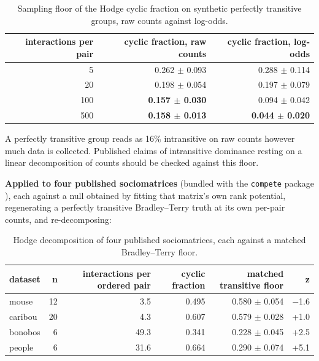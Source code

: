\documentclass[aps,pre,preprint,superscriptaddress,nofootinbib,longbibliography]{revtex4-2}
\begin{document}
\begin{table}[htbp]
\caption{Sampling floor of the Hodge cyclic fraction on synthetic perfectly transitive groups, raw counts against log-odds.}
\label{tab:21}
\begin{ruledtabular}
\begin{tabular}{rrr}
interactions per pair & cyclic fraction, raw counts & cyclic fraction, log-odds \\
\hline
5 & 0.262 $\pm$ 0.093 & 0.288 $\pm$ 0.114 \\
20 & 0.198 $\pm$ 0.054 & 0.197 $\pm$ 0.079 \\
100 & \textbf{0.157 $\pm$ 0.030} & 0.094 $\pm$ 0.042 \\
500 & \textbf{0.158 $\pm$ 0.013} & \textbf{0.044 $\pm$ 0.020} \\
\end{tabular}
\end{ruledtabular}
\end{table}

A perfectly transitive group reads as 16\% intransitive on raw counts however much data is collected. Published claims of intransitive dominance resting on a linear decomposition of counts should be checked against this floor.

\textbf{Applied to four published sociomatrices} (bundled with the \texttt{compete} package \cite{r29}), each against a null obtained by fitting that matrix's own rank potential, regenerating a perfectly transitive Bradley--Terry truth at its own per-pair counts, and re-decomposing:

\begin{table}[htbp]
\caption{Hodge decomposition of four published sociomatrices, each against a matched Bradley--Terry floor.}
\label{tab:22}
\begin{ruledtabular}
\begin{tabular}{lrrrrr}
dataset & n & interactions per ordered pair & cyclic fraction & matched transitive floor & z \\
\hline
mouse & 12 & 3.5 & 0.495 & 0.580 $\pm$ 0.054 & $-$1.6 \\
caribou & 20 & 4.3 & 0.607 & 0.579 $\pm$ 0.028 & +1.0 \\
bonobos & 6 & 49.3 & 0.341 & 0.228 $\pm$ 0.045 & +2.5 \\
people & 6 & 31.6 & 0.664 & 0.290 $\pm$ 0.074 & +5.1 \\
\end{tabular}
\end{ruledtabular}
\end{table}
\end{document}

